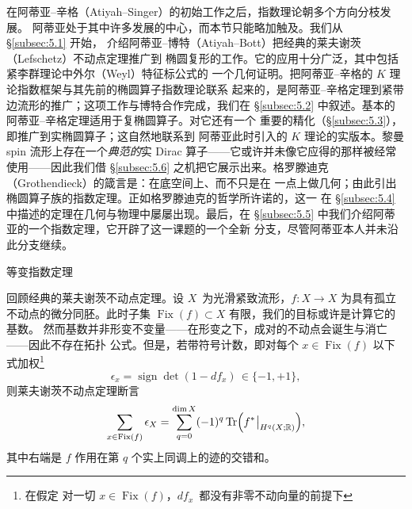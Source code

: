 \documentclass[11pt]{amsart}
\makeatletter
\def\subsection{\@startsection{subsection}{2}%
   \z@{1.25\linespacing\@plus.7\linespacing}{.5\linespacing}%
   {\normalfont\bfseries}}
\theoremstyle{definition}
\theoremstyle{remark}
\theoremstyle{plain}
\numberwithin{equation}{section}
\renewcommand{\:}{\colon}
\newcommand{\RR}{{\mathbb R}}
\DeclareMathOperator{\Tr}{Tr}
\DeclareRobustCommand{\mstrut}{^{\vphantom{1*\prime y\vee M}}}
\newcommand{\res}[1]{\negmedspace\bigm|\mstrut_{#1}}
\DeclareMathOperator{\Fix}{Fix}
\DeclareMathOperator{\sign}{sign}
\makeatother
\begin{document}
在阿蒂亚–辛格（Atiyah–Singer）的初始工作之后，指数理论朝多个方向分枝发展。
阿蒂亚处于其中许多发展的中心，而本节只能略加触及。我们从 \S\ref{subsec:5.1} 开始，
介绍阿蒂亚–博特（Atiyah–Bott）把经典的莱夫谢茨（Lefschetz）不动点定理推广到
椭圆复形的工作。它的应用十分广泛，其中包括紧李群理论中外尔（Weyl）特征标公式的
一个几何证明。把阿蒂亚–辛格的 $K$ 理论指数框架与其先前的椭圆算子指数理论联系
起来的，是阿蒂亚–辛格定理到紧带边流形的推广；这项工作与博特合作完成，我们在
\S\ref{subsec:5.2} 中叙述。基本的阿蒂亚–辛格定理适用于复椭圆算子。对它还有一个
重要的精化（\S\ref{subsec:5.3}），即推广到实椭圆算子；这自然地联系到
阿蒂亚此时引入的 $K$ 理论的实版本。黎曼 spin 流形上存在一个\emph{典范的}实
Dirac 算子——它或许并未像它应得的那样被经常使用——因此我们借 \S\ref{subsec:5.6}
之机把它展示出来。格罗滕迪克（Grothendieck）的箴言是：在底空间上、而不只是在
一点上做几何；由此引出椭圆算子族的指数定理。正如格罗滕迪克的哲学所许诺的，这一
在 \S\ref{subsec:5.4} 中描述的定理在几何与物理中屡屡出现。最后，在
\S\ref{subsec:5.5} 中我们介绍阿蒂亚的一个指数定理，它开辟了这一课题的一个全新
分支，尽管阿蒂亚本人并未沿此分支继续。


  \subsection{等变指数定理}\label{subsec:5.1}

回顾经典的莱夫谢茨不动点定理。设 $X$~为光滑紧致流形，$f\:X\to X$ 为具有孤立
不动点的微分同胚。此时子集 $\Fix(f)\subset X$ 有限，我们的目标或许是计算它的基数。
然而基数并非形变不变量——在形变之下，成对的不动点会诞生与消亡——因此不存在拓扑
公式。但是，若带符号计数，即对每个 $x\in \Fix(f)$ 以下式加权\footnote{在假定
对一切 $x\in \Fix(f)$，$df_x$~都没有非零不动向量的前提下}
  \begin{equation}\label{eq:50}
     \epsilon _x=\sign\det(1-df_x)\,\in \{-1,+1\}, 
  \end{equation}
则莱夫谢茨不动点定理断言
  \begin{equation}\label{eq:51}
     \sum\limits_{x\in \Fix(f)}\epsilon _X = \sum\limits_{q=0}^{\dim X}
     (-1)^q\Tr\Bigl( f^*\res{H^q(X;\RR)} \Bigr) , 
  \end{equation}
其中右端是 $f$ 作用在第 $q$ 个实上同调上的迹的交错和。
\end{document}

